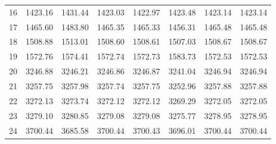 \documentclass[10pt,oneside]{article}
\begin{document}
\begin{table}[h!]
\begin{tabular}{cccccccc}
16 &   1423.16 & 1431.44 & 1423.03 & 1422.97 &      1423.48 & 1423.14 & 1423.14 \\
17 &   1465.60 & 1483.80 & 1465.35 & 1465.33 &      1456.31 & 1465.48 & 1465.48 \\
18 &   1508.88 & 1513.01 & 1508.60 & 1508.61 &      1507.03 & 1508.67 & 1508.67 \\
19 &   1572.76 & 1574.41 & 1572.74 & 1572.73 &      1583.73 & 1572.53 & 1572.53 \\
20 &   3246.88 & 3246.21 & 3246.86 & 3246.87 &      3241.04 & 3246.94 & 3246.94 \\
21 &   3257.75 & 3257.98 & 3257.74 & 3257.75 &      3252.96 & 3257.88 & 3257.88 \\
22 &   3272.13 & 3273.74 & 3272.12 & 3272.12 &      3269.29 & 3272.05 & 3272.05 \\
23 &   3279.10 & 3280.85 & 3279.08 & 3279.08 &      3275.77 & 3278.95 & 3278.95 \\
24 &   3700.44 & 3685.58 & 3700.44 & 3700.43 &      3696.01 & 3700.44 & 3700.44 \\
\bottomrule
\end{tabular}
\end{table}

\clearpage
\end{document}
